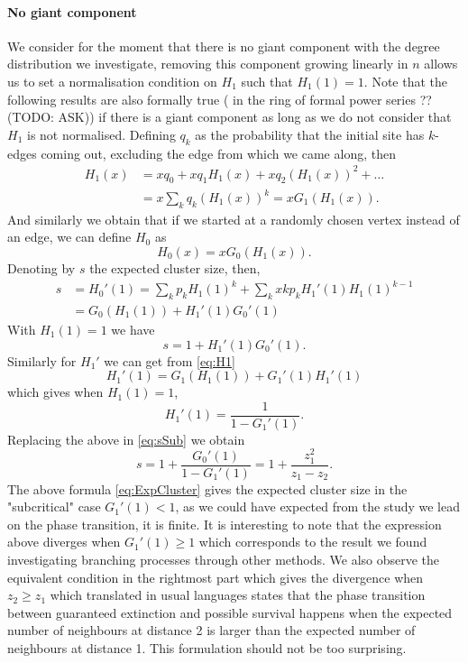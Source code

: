 \paragraph{No giant component}
We consider for the moment that there is no giant component with the degree distribution we investigate, removing this component growing linearly in $n$ allows us to set a normalisation condition on $H_1$ such that $H_1(1) = 1$.
Note that the following results are also formally true ( in the ring of formal power series ?? (TODO: ASK)) if there is a giant component as long as we do not consider that $H_1$ is not normalised.
Defining $q_k$ as the probability that the initial site has $k$-edges coming out, excluding the edge from which we came along, then
\begin{align}\label{eq:H1}
	H_1(x) 	&= xq_0 + xq_1H_1(x) + xq_2 (H_1(x))^2 + \ldots\\
		&= x \sum_k q_k (H_1(x))^k = xG_1(H_1(x)).
\end{align}
And similarly we obtain that if we started at a randomly chosen vertex instead of an edge, we can define $H_0$ as
\begin{equation}\label{eq:defH0}
	H_0(x) = x G_0(H_1(x)).
\end{equation}
Denoting by $s$ the expected cluster size, then,
\begin{align}\label{eq:sH0}
	s &= H_0'(1) =  \sum_k p_k H_1(1)^k + \sum_k x k p_k H_1'(1) H_1(1)^{k-1} \\
		 &= G_0(H_1(1)) + H_1'(1)G_0'(1)
\end{align}
With $H_1(1) = 1$ we have
\begin{equation}\label{eq:sSub}
	s = 1 + H_1'(1)G_0'(1).
\end{equation}
\newline
Similarly for $H_1'$ we can get from \eqref{eq:H1}
\begin{equation}\label{eq:sH1}
	H_1'(1) = G_1(H_1(1)) + G_1'(1)H_1'(1)
\end{equation}
which gives when $H_1(1) = 1$,
\begin{equation}
	H_1'(1) = \frac{1}{1- G_1'(1)}.
\end{equation}
Replacing the above in \eqref{eq:sSub} we obtain
\begin{equation}\label{eq:ExpCluster}
	s = 1 + \frac{G_0'(1)}{1-G_1'(1)} = 1 + \frac{z_1^2}{z_1 - z_2}.
\end{equation}
The above formula \eqref{eq:ExpCluster} gives the expected cluster size in the "subcritical" case $G_1'(1) < 1$, as we could have expected from the study we lead on the phase transition, it is finite.
It is interesting to note that the expression above diverges when $G_1'(1) \geq 1$ which corresponds to the result we found investigating branching processes through other methods.
We also observe the equivalent condition in the rightmost part which gives the divergence when $z_2 \geq z_1$ which translated in usual languages states that the phase transition between guaranteed extinction and possible survival happens when the expected number of neighbours at distance 2 is larger than the expected number of neighbours at distance 1.
This formulation should not be too surprising.
\newline
